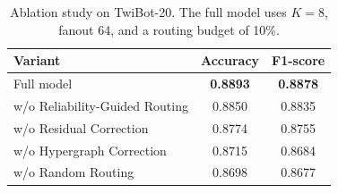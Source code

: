 \begin{table}[t]
\caption{Ablation study on TwiBot-20. The full model uses $K=8$, fanout 64, and a routing budget of 10\%.}
\label{tab:component-ablation}
\centering
\small
\begin{tabular}{lcc}
\toprule
Variant & Accuracy & F1-score \\
\midrule
Full model & \textbf{0.8893} & \textbf{0.8878} \\
w/o Reliability-Guided Routing & 0.8850 & 0.8835 \\
w/o Residual Correction & 0.8774 & 0.8755 \\
w/o Hypergraph Correction & 0.8715 & 0.8684 \\
w/o Random Routing & 0.8698 & 0.8677 \\
\bottomrule
\end{tabular}
\end{table}
